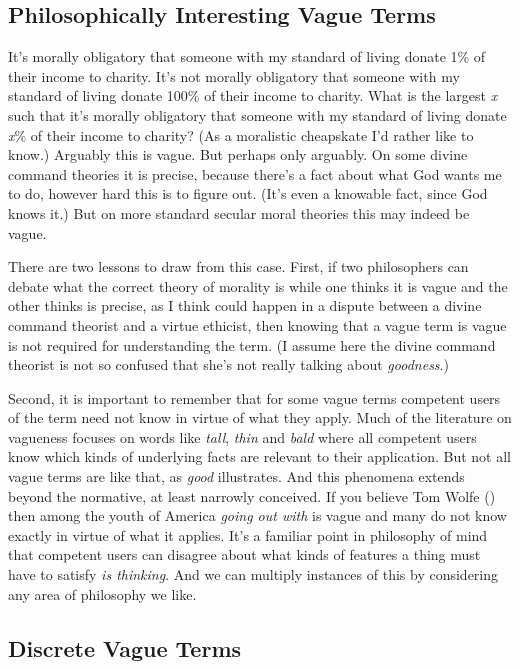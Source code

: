 \documentclass[
  10pt,
  letterpaper,
  DIV=11,
  numbers=noendperiod,
  twoside]{scrartcl}
\begin{document}
\subsection{Philosophically Interesting Vague
Terms}\label{philosophically-interesting-vague-terms}

It's morally obligatory that someone with my standard of living donate
1\% of their income to charity. It's not morally obligatory that someone
with my standard of living donate 100\% of their income to charity. What
is the largest \emph{x} such that it's morally obligatory that someone
with my standard of living donate \emph{x}\% of their income to charity?
(As a moralistic cheapskate I'd rather like to know.) Arguably this is
vague. But perhaps only arguably. On some divine command theories it is
precise, because there's a fact about what God wants me to do, however
hard this is to figure out. (It's even a knowable fact, since God knows
it.) But on more standard secular moral theories this may indeed be
vague.

There are two lessons to draw from this case. First, if two philosophers
can debate what the correct theory of morality is while one thinks it is
vague and the other thinks is precise, as I think could happen in a
dispute between a divine command theorist and a virtue ethicist, then
knowing that a vague term is vague is not required for understanding the
term. (I assume here the divine command theorist is not so confused that
she's not really talking about \emph{goodness}.)

Second, it is important to remember that for some vague terms competent
users of the term need not know in virtue of what they apply. Much of
the literature on vagueness focuses on words like \emph{tall},
\emph{thin} and \emph{bald} where all competent users know which kinds
of underlying facts are relevant to their application. But not all vague
terms are like that, as \emph{good} illustrates. And this phenomena
extends beyond the normative, at least narrowly conceived. If you
believe Tom Wolfe () then among the youth
of America \emph{going out with} is vague and many do not know exactly
in virtue of what it applies. It's a familiar point in philosophy of
mind that competent users can disagree about what kinds of features a
thing must have to satisfy \emph{is thinking}. And we can multiply
instances of this by considering any area of philosophy we like.

\subsection{Discrete Vague Terms}\label{discrete-vague-terms}
\end{document}
